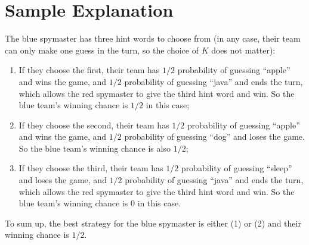\section*{Sample Explanation}

The blue spymaster has three hint words to choose from (in any case, their team can only make one guess in the turn, so the choice of $K$ does not matter):
\begin{enumerate}
	\item If they choose the first, their team has $1/2$ probability of guessing ``apple'' and wins the game, and $1/2$ probability of guessing ``java'' and ends the turn, which allows the red spymaster to give the third hint word and win. So the blue team's winning chance is $1/2$ in this case;
	\item If they choose the second, their team has $1/2$ probability of guessing ``apple'' and wins the game, and $1/2$ probability of guessing ``dog'' and loses the game. So the blue team's winning chance is also $1/2$;
	\item If they choose the third, their team has $1/2$ probability of guessing ``sleep'' and loses the game, and $1/2$ probability of guessing ``java'' and ends the turn, which allows the red spymaster to give the third hint word and win. So the blue team's winning chance is $0$ in this case.
\end{enumerate}

To sum up, the best strategy for the blue spymaster is either (1) or (2) and their winning chance is $1/2$.
